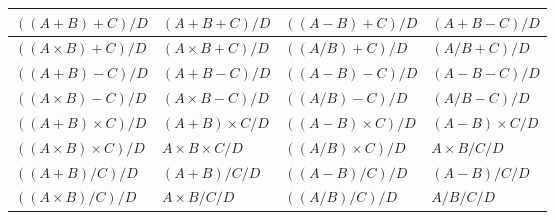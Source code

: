 \documentclass[11pt]{article}
\begin{document}
\begin{table}[htbp]
{\begin{tabular}{|l|l|l|l|}
$((A+B)+C)/D$ & $(A+B+C)/D$ & $((A-B)+C)/D$ & $(A+B-C)/D$  \\ \hline
$((A \times B)+C)/D$ & $(A \times B+C)/D$ & $((A/B)+C)/D$ & $(A/B+C)/D$  \\ \hline
$((A+B)-C)/D$ & $(A+B-C)/D$ & $((A-B)-C)/D$ & $(A-B-C)/D$  \\ \hline
$((A \times B)-C)/D$ & $(A \times B-C)/D$ & $((A/B)-C)/D$ & $(A/B-C)/D$  \\ \hline
$((A+B) \times C)/D$ & $(A+B) \times C/D$ & $((A-B) \times C)/D$ & $(A-B) \times C/D$  \\ \hline
$((A \times B) \times C)/D$ & $A \times B \times C/D$ & $((A/B) \times C)/D$ & $A \times B/C/D$  \\ \hline
$((A+B)/C)/D$ & $(A+B)/C/D$ & $((A-B)/C)/D$ & $(A-B)/C/D$  \\ \hline
$((A \times B)/C)/D$ & $A \times B/C/D$ & $((A/B)/C)/D$ & $A/B/C/D$  \\ \bottomrule
\end{tabular}
}
\end{table}
\end{document}
